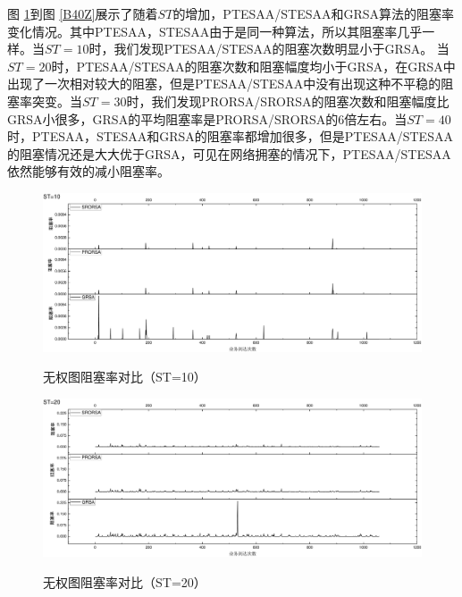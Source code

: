 图 \ref{B10Z}到图 \ref{B40Z}展示了随着$ST$的增加，PTESAA/STESAA和GRSA算法的阻塞率变化情况。其中PTESAA，STESAA由于是同一种算法，所以其阻塞率几乎一样。当$ST=10$时，我们发现PTESAA/STESAA的阻塞次数明显小于GRSA。 当$ST=20$时，PTESAA/STESAA的阻塞次数和阻塞幅度均小于GRSA，在GRSA中出现了一次相对较大的阻塞，但是PTESAA/STESAA中没有出现这种不平稳的阻塞率突变。当$ST=30$时，我们发现PRORSA/SRORSA的阻塞次数和阻塞幅度比GRSA小很多，GRSA的平均阻塞率是PRORSA/SRORSA的6倍左右。当$ST=40$时，PTESAA，STESAA和GRSA的阻塞率都增加很多，但是PTESAA/STESAA的阻塞情况还是大大优于GRSA，可见在网络拥塞的情况下，PTESAA/STESAA依然能够有效的减小阻塞率。
\begin{figure}
\setlength{\belowcaptionskip}{-0.5cm}
\begin{center}
{\includegraphics[width=1 \textwidth]{figures/B10Z.pdf}}
\end{center}
\caption{{\footnotesize{无权图阻塞率对比（ST=10）}}}
\label{B10Z}
\end{figure}
\begin{figure}
\setlength{\belowcaptionskip}{-0.5cm}
\begin{center}
{\includegraphics[width=1 \textwidth]{figures/B20Z.pdf}}
\end{center}
\caption{{\footnotesize{无权图阻塞率对比（ST=20）}}}
\label{B20Z}
\end{figure}
